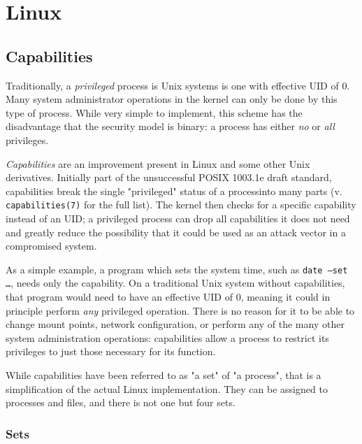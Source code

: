 \section{Linux}

\subsection{Capabilities}

Traditionally, a \textit{privileged} process is Unix systems is one with
effective UID of 0.  Many system administrator operations in the kernel can only
be done by this type of process.  While very simple to implement, this scheme
has the disadvantage that the security model is binary: a process has either
\emph{no} or \emph{all} privileges.

\textit{Capabilities} are an improvement present in Linux and some other Unix
derivatives.  Initially part of the unsuccessful POSIX 1003.1e draft standard,
capabilities break the single "privileged" status of a process\footnotemark into
many parts (v. \texttt{capabilities(7)} for the full list).  The kernel then
checks for a specific capability instead of an UID; a privileged process can
drop all capabilities it does not need and greatly reduce the possibility that
it could be used as an attack vector in a compromised system.


As a simple example, a program which sets the system time, such as \texttt{date
--set …}, needs only the  capability.  On a traditional Unix
system without capabilities, that program would need to have an effective UID of
0, meaning it could in principle perform \emph{any} privileged operation.  There
is no reason for it to be able to change mount points, network configuration, or
perform any of the many other system administration operations: capabilities
allow a process to restrict its privileges to just those necessary for its
function.

While capabilities have been referred to as "a set" of "a process", that is a
simplification of the actual Linux implementation.  They can be assigned to
processes and files, and there is not one but four sets.

\subsubsection{Sets}

